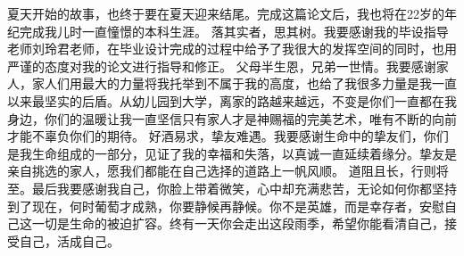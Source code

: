 \documentclass[twoside]{thesis-cls-Miya} %
\begin{document}
夏天开始的故事，也终于要在夏天迎来结尾。完成这篇论文后，我也将在22岁的年纪完成我儿时一直憧憬的本科生涯。
落其实者，思其树。我要感谢我的毕设指导老师刘玲君老师，在毕业设计完成的过程中给予了我很大的发挥空间的同时，也用严谨的态度对我的论文进行指导和修正。
父母半生恩，兄弟一世情。我要感谢家人，家人们用最大的力量将我托举到不属于我的高度，也给了我很多力量是我一直以来最坚实的后盾。从幼儿园到大学，离家的路越来越远，不变是你们一直都在我身边，你们的温暖让我一直坚信只有家人才是神赐福的完美艺术，唯有不断的向前才能不辜负你们的期待。
好酒易求，挚友难遇。我要感谢生命中的挚友们，你们是我生命组成的一部分，见证了我的幸福和失落，以真诚一直延续着缘分。挚友是亲自挑选的家人，愿我们都能在自己选择的道路上一帆风顺。
道阻且长，行则将至。最后我要感谢我自己，你脸上带着微笑，心中却充满悲苦，无论如何你都坚持到了现在，何时葡萄才成熟，你要静候再静候。你不是英雄，而是幸存者，安慰自己这一切是生命的被迫扩容。终有一天你会走出这段雨季，希望你能看清自己，接受自己，活成自己。
\end{document}
